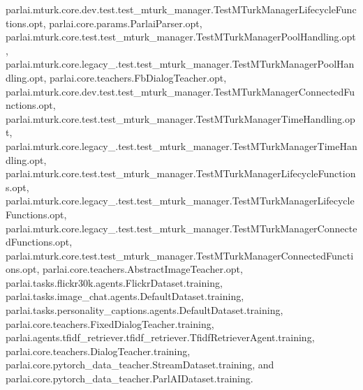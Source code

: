 parlai.\+mturk.\+core.\+dev.\+test.\+test\+\_\+mturk\+\_\+manager.\+Test\+M\+Turk\+Manager\+Lifecycle\+Functions.\+opt, parlai.\+core.\+params.\+Parlai\+Parser.\+opt, parlai.\+mturk.\+core.\+test.\+test\+\_\+mturk\+\_\+manager.\+Test\+M\+Turk\+Manager\+Pool\+Handling.\+opt, parlai.\+mturk.\+core.\+legacy\+\_.\+test.\+test\+\_\+mturk\+\_\+manager.\+Test\+M\+Turk\+Manager\+Pool\+Handling.\+opt, parlai.\+core.\+teachers.\+Fb\+Dialog\+Teacher.\+opt, parlai.\+mturk.\+core.\+dev.\+test.\+test\+\_\+mturk\+\_\+manager.\+Test\+M\+Turk\+Manager\+Connected\+Functions.\+opt, parlai.\+mturk.\+core.\+test.\+test\+\_\+mturk\+\_\+manager.\+Test\+M\+Turk\+Manager\+Time\+Handling.\+opt, parlai.\+mturk.\+core.\+legacy\+\_.\+test.\+test\+\_\+mturk\+\_\+manager.\+Test\+M\+Turk\+Manager\+Time\+Handling.\+opt, parlai.\+mturk.\+core.\+test.\+test\+\_\+mturk\+\_\+manager.\+Test\+M\+Turk\+Manager\+Lifecycle\+Functions.\+opt, parlai.\+mturk.\+core.\+legacy\+\_.\+test.\+test\+\_\+mturk\+\_\+manager.\+Test\+M\+Turk\+Manager\+Lifecycle\+Functions.\+opt, parlai.\+mturk.\+core.\+legacy\+\_.\+test.\+test\+\_\+mturk\+\_\+manager.\+Test\+M\+Turk\+Manager\+Connected\+Functions.\+opt, parlai.\+mturk.\+core.\+test.\+test\+\_\+mturk\+\_\+manager.\+Test\+M\+Turk\+Manager\+Connected\+Functions.\+opt, parlai.\+core.\+teachers.\+Abstract\+Image\+Teacher.\+opt, parlai.\+tasks.\+flickr30k.\+agents.\+Flickr\+Dataset.\+training, parlai.\+tasks.\+image\+\_\+chat.\+agents.\+Default\+Dataset.\+training, parlai.\+tasks.\+personality\+\_\+captions.\+agents.\+Default\+Dataset.\+training, parlai.\+core.\+teachers.\+Fixed\+Dialog\+Teacher.\+training, parlai.\+agents.\+tfidf\+\_\+retriever.\+tfidf\+\_\+retriever.\+Tfidf\+Retriever\+Agent.\+training, parlai.\+core.\+teachers.\+Dialog\+Teacher.\+training, parlai.\+core.\+pytorch\+\_\+data\+\_\+teacher.\+Stream\+Dataset.\+training, and parlai.\+core.\+pytorch\+\_\+data\+\_\+teacher.\+Parl\+A\+I\+Dataset.\+training.

